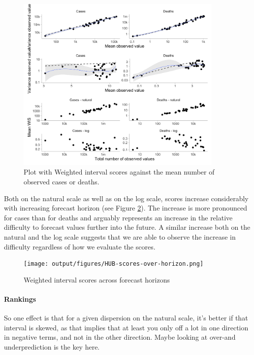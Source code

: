 \documentclass{article}
\begin{document}
\begin{figure}[h!]
    \centering
    \includegraphics[width=0.9\textwidth]{output/figures/HUB-mean-scores-vs-total-log-log.png}
    \caption{Plot with Weighted interval scores against the mean number of observed cases or deaths.}
    \label{fig:HUB-mean-scores-total-loglog}
\end{figure}

Both on the natural scale as well as on the log scale, scores increase considerably with increasing forecast horizon (see Figure \ref{fig:HUB-scores-horizon}). The increase is more pronounced for cases than for deaths and arguably represents an increase in the relative difficulty to forecast values further into the future. A similar increase both on the natural and the log scale suggests that we are able to observe the increase in difficulty regardless of how we evaluate the scores. 

\begin{figure}[h!]
    \centering
    \texttt{[image: output/figures/HUB-scores-over-horizon.png]}
    \caption{Weighted interval scores across forecast horizons}
    \label{fig:HUB-scores-horizon}
\end{figure}

\paragraph{Rankings}
So one effect is that for a given dispersion on the natural scale, it's better if that interval is skewed, as that implies that at least you only off a lot in one direction in negative terms, and not in the other direction. Maybe looking at over-and underprediction is the key here. 
\end{document}
